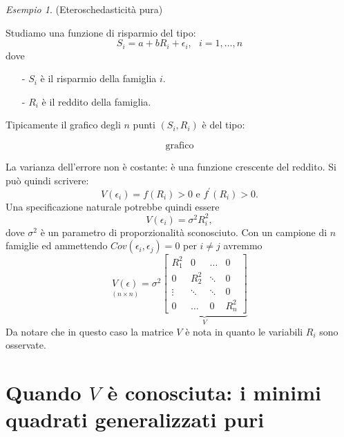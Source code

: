 \documentclass[a4paper]{report}
\newcounter{ese}
\theoremstyle{remark}
\newtheorem{esempio}[ese]{Esempio}
\newcounter{theor}
\begin{document}
\begin{esempio}
\label{esempio_mqg_puri} (Eteroschedasticit\`{a} pura)

Studiamo una funzione di risparmio del tipo: 
\begin{equation}
S_{i}=a+bR_{i}+\epsilon _{i},\ \ \ i=1,\dots ,n
\end{equation}%
dove

\begin{enumerate}
\item[-] $S_i$ \`e il risparmio della famiglia $i$.

\item[-] $R_i$ \`e il reddito della famiglia.
\end{enumerate}

\noindent Tipicamente il grafico degli $n$ punti $(S_i,R_i)$ \`e del tipo:

\begin{equation*}
\text{grafico}
\end{equation*}%
\vspace{5cm}

\noindent La varianza dell'errore non \`e costante: \`e una funzione
crescente del reddito. Si pu\`o quindi scrivere: 
\begin{equation*}
V(\epsilon_i)=f(R_i)>0 \text{ e } f^{\prime }(R_i) > 0.
\end{equation*}
Una specificazione naturale potrebbe quindi essere 
\begin{equation*}
V(\epsilon_i)=\sigma^2R_i^2,
\end{equation*}
dove $\sigma^2$ \`e un parametro di proporzionalit\`a sconosciuto. Con un
campione di $n$ famiglie ed ammettendo $Cov(\epsilon_i, \epsilon_j)=0$ per $%
i \neq j$ avremmo 
\begin{equation}
\underset{(n \times n)}{V(\epsilon)}=\sigma^2\underset{V}{\underbrace{ \left[
\begin{array}{cccc}
R_1^2 & 0 & \dots & 0 \\ 
0 & R_2^2 & \ddots & 0 \\ 
\vdots & \ddots & \ddots & 0 \\ 
0 & \dots & 0 & R_n^2%
\end{array}
\right] }}
\end{equation}
Da notare che in questo caso la matrice $V$ \`e nota in quanto le variabili $%
R_i$ sono osservate.
\end{esempio}

\section{Quando $V$ \`{e} conosciuta: i minimi quadrati generalizzati puri}
\end{document}
